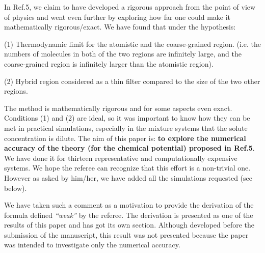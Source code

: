 \documentclass[12pt]{article}
\newcommand{\recheck}[1]{{\color{red} #1}}
\begin{document}
In Ref.5, we claim to have developed a rigorous approach from the
point of view of physics and went even further by exploring how far
one could make it mathematically rigorous/exact. We have found that
under the hypothesis:

(1) Thermodynamic limit for the {atomistic and the coarse-grained region. (i.e. the numbers of molecules in both of the two
  regions are infinitely large, and the coarse-grained region is infinitely larger than the atomistic region)}.

(2) Hybrid region considered as a thin filter compared to the size of the two other regions.

The method is mathematically rigorous and for some aspects even
exact. Conditions (1) and (2) are ideal, so it was important to know
how they can be met in {practical simulations, especially in
the mixture systems that the solute concentration is dilute.} The aim of this paper is: {\bf to
  explore the numerical accuracy of the theory (for the chemical
  potential) proposed in Ref.5}.  We have done it for thirteen
representative and computationally expensive systems.  We hope the
referee can recognize that this effort is a non-trivial one. However
as asked by him/her, we have added all the simulations requested (see
below).

{\color{blue}{\it On the other hand, the paper lacks important pieces of information and many incomplete statements and definitions (see below). There is also a theoretical
    weakness in the sense that the main equation used to evaluate the chem. potential seems to be derived in an ad hoc fashion, and ``proven numerically'', as the authors wrote. It is not easy to rely on an equation/method which lacks a solid theoretical background (mostly in statistical physics)}}

We have taken such a comment as a motivation to {provide the} derivation of the formula defined {\it ``weak''} by the referee. The derivation is presented as one of the results of this paper and has got its own section.
Although developed before the submission of the manuscript, this result was not presented because the paper was intended to investigate only the numerical accuracy.
\end{document}
